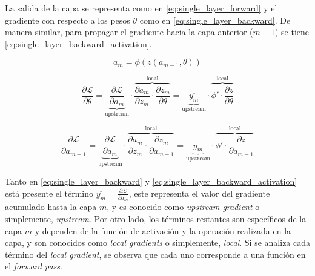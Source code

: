 
La salida de la capa se representa como en \eqref{eq:single_layer_forward} y el gradiente con respecto a los pesos $\theta$ como en \eqref{eq:single_layer_backward}. De manera similar, para propagar el gradiente hacia la capa anterior ($m-1$) se tiene \eqref{eq:single_layer_backward_activation}.

\begin{equation}
    \label{eq:single_layer_forward}
    a_{m} = \phi\left(z\left(a_{m-1}, \theta\right)\right)
\end{equation}

\begin{equation}
    \label{eq:single_layer_backward}
    \frac{\partial \mathcal{L}}{\partial \theta} =
    \underbrace{\frac{\partial \mathcal{L}}{\partial a_{m}}}_{\text{upstream}} \cdot
    \overbrace{
    \frac{\partial a_{m}}{\partial z_m} \cdot
    \frac{\partial z_{m}}{\partial \theta}
    }^{\text{local}} =
    \underbrace{\overline{y_{m}}}_{\text{upstream}} \cdot
    \overbrace{
    \phi' \cdot
    \frac{\partial z}{\partial \theta}
    }^{\text{local}}
\end{equation}

\begin{equation}
    \label{eq:single_layer_backward_activation}
    \frac{\partial \mathcal{L}}{\partial a_{m-1}} =
    \underbrace{\frac{\partial \mathcal{L}}{\partial a_{m}}}_{\text{upstream}} \cdot
    \overbrace{
    \frac{\partial a_{m}}{\partial z_m} \cdot
    \frac{\partial z_m}{\partial a_{m-1}}
    }^{\text{local}} =
    \underbrace{\overline{y_{m}}}_{\text{upstream}} \cdot
    \overbrace{
    \phi' \cdot
    \frac{\partial z}{\partial a_{m-1}}
    }^{\text{local}}
\end{equation}

Tanto en \eqref{eq:single_layer_backward} y \eqref{eq:single_layer_backward_activation}  está presente el término $\overline{y_m} = \frac{\partial \mathcal{L}}{\partial a_{m}}$, este representa el valor del gradiente acumulado hasta la capa $m$, y es conocido como \textit{upstream gradient} o simplemente, \textit{upstream}. Por otro lado, los términos restantes son específicos de la capa $m$ y dependen de la función de activación y la operación realizada en la capa, y son conocidos como \textit{local gradients} o simplemente, \textit{local}. Si se analiza cada término del \textit{local gradient}, se observa que cada uno corresponde a una función en el \textit{forward pass}.

